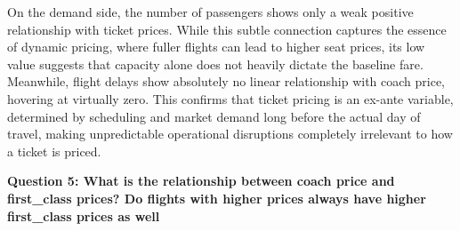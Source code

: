 \documentclass[11pt,a4paper]{article}
\begin{document}
 On the demand side, the number of passengers shows only a weak positive relationship with ticket prices. While this subtle connection captures the essence of dynamic pricing, where fuller flights can lead to higher seat prices, its low value suggests that capacity alone does not heavily dictate the baseline fare. Meanwhile, flight delays show absolutely no linear relationship with coach price, hovering at virtually zero. This confirms that ticket pricing is an ex-ante variable, determined by scheduling and market demand long before the actual day of travel, making unpredictable operational disruptions completely irrelevant to how a ticket is priced.
\vspace{2.5em}

\noindent \textbf{\large Question 5:
What is the relationship between coach price and first\_class prices? Do flights with higher prices always have higher first\_class prices as well}
\end{document}
